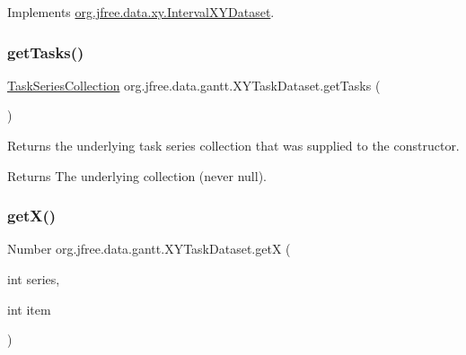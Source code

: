 Implements \mbox{\hyperlink{interfaceorg_1_1jfree_1_1data_1_1xy_1_1_interval_x_y_dataset_aed1acf6e36561ce5acc3f6811a2ecef9}{org.\+jfree.\+data.\+xy.\+Interval\+X\+Y\+Dataset}}.

\mbox{\label{classorg_1_1jfree_1_1data_1_1gantt_1_1_x_y_task_dataset_ac7a8dfa51c807bee598741f8995b071d}} 
\subsubsection{\texorpdfstring{get\+Tasks()}{getTasks()}}
{\footnotesize\ttfamily \mbox{\hyperlink{classorg_1_1jfree_1_1data_1_1gantt_1_1_task_series_collection}{Task\+Series\+Collection}} org.\+jfree.\+data.\+gantt.\+X\+Y\+Task\+Dataset.\+get\+Tasks (\begin{DoxyParamCaption}{ }\end{DoxyParamCaption})}

Returns the underlying task series collection that was supplied to the constructor.

\begin{DoxyReturn}{Returns}
The underlying collection (never {\ttfamily null}). 
\end{DoxyReturn}
\mbox{\label{classorg_1_1jfree_1_1data_1_1gantt_1_1_x_y_task_dataset_a782158dc49cc9885099754f4fefa45ce}} 
\subsubsection{\texorpdfstring{get\+X()}{getX()}}
{\footnotesize\ttfamily Number org.\+jfree.\+data.\+gantt.\+X\+Y\+Task\+Dataset.\+getX (\begin{DoxyParamCaption}\item[{int}]{series,  }\item[{int}]{item }\end{DoxyParamCaption})}

